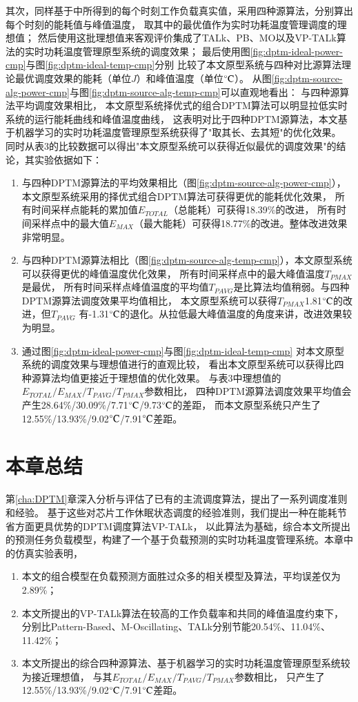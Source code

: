 其次，同样基于中所得到的每个时刻工作负载真实值，采用四种源算法，分别算出每个时刻的能耗值与峰值温度， 取其中的最优值作为实时功耗温度管理调度的理想值； 然后使用这批理想值来客观评价集成了TALk、PB、MO以及VP-TALk算法的实时功耗温度管理原型系统的调度效果； 最后使用图\ref{fig:dptm-ideal-power-cmp}与图\ref{fig:dptm-ideal-temp-cmp}分别 比较了本文原型系统与四种对比源算法理论最优调度效果的能耗（单位$J$）和峰值温度（单位$\celsius$）。
从图\ref{fig:dptm-source-alg-power-cmp}与图\ref{fig:dptm-source-alg-temp-cmp}可以直观地看出： 与四种源算法平均调度效果相比， 本文原型系统择优式的组合DPTM算法可以明显拉低实时系统的运行能耗曲线和峰值温度曲线， 这表明对比于四种DPTM源算法，本文基于机器学习的实时功耗温度管理原型系统获得了"取其长、去其短"的优化效果。 同时从表3的比较数据可以得出"本文原型系统可以获得近似最优的调度效果"的结论，其实验依据如下：
\begin{enumerate}[1)]
\item 与四种DPTM源算法的平均效果相比（图\ref{fig:dptm-source-alg-power-cmp}）， 本文原型系统采用的择优式组合DPTM算法可获得更优的能耗优化效果， 所有时间采样点能耗的累加值$E_{TOTAL}$（总能耗）可获得18.39\%的改进， 所有时间采样点中的最大值$E_{MAX}$（最大能耗）可获得18.77\%的改进。整体改进效果非常明显。
\item 与四种DPTM源算法相比（图\ref{fig:dptm-source-alg-temp-cmp}），本文原型系统可以获得更优的峰值温度优化效果， 所有时间采样点中的最大峰值温度$T_{PMAX}$是最优， 所有时间采样点峰值温度的平均值$T_{PAVG}$是比算法均值稍弱。与四种DPTM源算法调度效果平均值相比， 本文原型系统可以获得$T_{PMAX}$1.81$\celsius$的改进，但$T_{PAVG}$ 有-1.31$\celsius$的退化。从拉低最大峰值温度的角度来讲，改进效果较为明显。
\item 通过图\ref{fig:dptm-ideal-power-cmp}与图\ref{fig:dptm-ideal-temp-cmp} 对本文原型系统的调度效果与理想值进行的直观比较， 看出本文原型系统可以获得比四种源算法均值更接近于理想值的优化效果。 与表3中理想值的$E_{TOTAL}/E_{MAX}/T_{PAVG}/T_{PMAX}$参数相比， 四种DPTM源算法调度效果平均值会产生28.64\%/30.09\%/7.71$\celsius$/9.73$\celsius$的差距， 而本文原型系统只产生了12.55\%/13.93\%/9.02$\celsius$/7.91$\celsius$差距。
\end{enumerate}

\section{本章总结}
第\ref{cha:DPTM}章深入分析与评估了已有的主流调度算法，提出了一系列调度准则和经验。 基于这些对芯片工作休眠状态调度的经验准则，我们提出一种在能耗节省方面更具优势的DPTM调度算法VP-TALk， 以此算法为基础，综合本文所提出的预测任务负载模型，构建了一个基于负载预测的实时功耗温度管理系统。本章中的仿真实验表明，
\begin{enumerate}[1)]
\item 本文的组合模型在负载预测方面胜过众多的相关模型及算法，平均误差仅为2.89\%；
\item 本文所提出的VP-TALk算法在较高的工作负载率和共同的峰值温度约束下， 分别比Pattern-Based、M-Oscillating、TALk分别节能20.54\%、11.04\%、11.42\%；
\item 本文所提出的综合四种源算法、基于机器学习的实时功耗温度管理原型系统较为接近理想值， 与其$E_{TOTAL}/E_{MAX}/T_{PAVG}/T_{PMAX}$参数相比， 只产生了12.55\%/13.93\%/9.02$\celsius$/7.91$\celsius$差距。
\end{enumerate}
